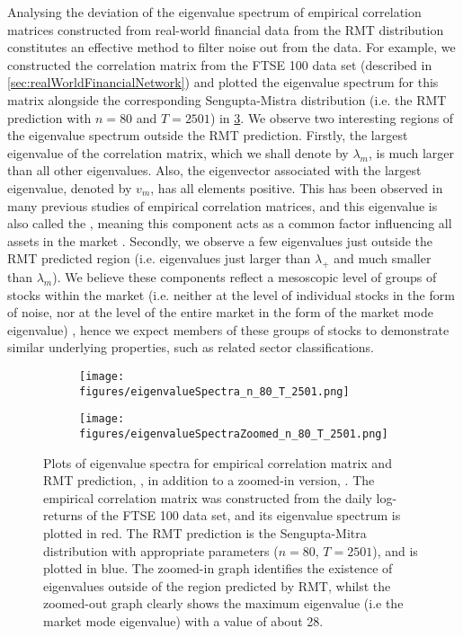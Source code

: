 Analysing the deviation of the eigenvalue spectrum of empirical correlation matrices constructed from real-world financial data from the RMT distribution constitutes an effective method to filter noise out from the data.
For example, we constructed the correlation matrix from the FTSE 100 data set (described in \cref{sec:realWorldFinancialNetwork}) and plotted the eigenvalue spectrum for this matrix alongside the corresponding Sengupta-Mistra distribution (i.e. the RMT prediction with $n = 80$ and $T = 2501$) in \cref{fig:eigenvalueSpectra}.
We observe two interesting regions of the eigenvalue spectrum outside the RMT prediction.
Firstly, the largest eigenvalue of the correlation matrix, which we shall denote by $\lambda_{m}$, is much larger than all other eigenvalues.
Also, the eigenvector associated with the largest eigenvalue, denoted by $v_{m}$, has all elements positive.
This has been observed in many previous studies of empirical correlation matrices, and this eigenvalue is also called the , meaning this component acts as a common factor influencing all assets in the market \cite{FPW+11,MG13}.
Secondly, we observe a few eigenvalues just outside the RMT predicted region (i.e. eigenvalues just larger than $\lambda_{+}$ and much smaller than $\lambda_{m}$).
We believe these components reflect a mesoscopic level of groups of stocks within the market (i.e. neither at the level of individual stocks in the form of noise, nor at the level of the entire market in the form of the market mode eigenvalue) \cite{MG13}, hence we expect members of these groups of stocks to demonstrate similar underlying properties, such as related sector classifications.

\begin{figure}
	\centering
	\begin{subfigure}{.5\textwidth}
		\centering
		\texttt{[image: figures/eigenvalueSpectra\_n\_80\_T\_2501.png]}
		\caption{}
		\label{fig:eigenvalueSpectrumOriginal}
	\end{subfigure}%
	\begin{subfigure}{.5\textwidth}
		\centering
		\texttt{[image: figures/eigenvalueSpectraZoomed\_n\_80\_T\_2501.png]}
		\caption{}
		\label{fig:eigenvalueSpectrumZoomed}
	\end{subfigure}
	\caption[Plots of empirical and RMT predicted eigenvalue spectrum]{\label{fig:eigenvalueSpectra} Plots of eigenvalue spectra for empirical correlation matrix and RMT prediction, , in addition to a zoomed-in version, . The empirical correlation matrix was constructed from the daily log-returns of the FTSE 100 data set, and its eigenvalue spectrum is plotted in red. The RMT prediction is the Sengupta-Mitra distribution with appropriate parameters ($n = 80$, $T = 2501$), and is plotted in blue. The zoomed-in graph identifies the existence of eigenvalues outside of the region predicted by RMT, whilst the zoomed-out graph clearly shows the maximum eigenvalue (i.e the market mode eigenvalue) with a value of about 28.}
\end{figure}

